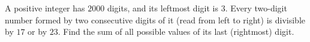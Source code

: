 A positive integer has $2000$ digits, and its leftmost digit is $3$. Every two-digit number formed by two consecutive digits of it (read from left to right) is divisible by $17$ or by $23$. Find the sum of all possible values of its last (rightmost) digit.
